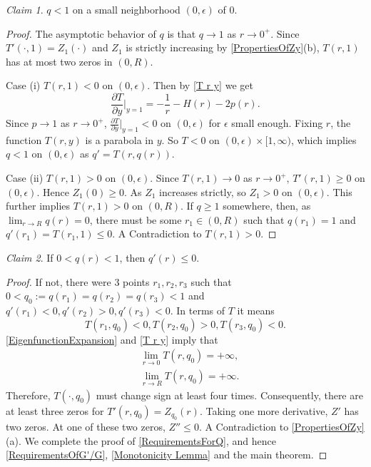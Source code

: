 \documentclass{amsart}
\numberwithin{equation}{section}
\theoremstyle{plain}
\theoremstyle{definition}
\theoremstyle{remark}
\newtheorem*{claim}{Claim}
\begin{document}
\begin{claim}
    $q<1$ on a small neighborhood $(0,\epsilon)$ of $0$.
\end{claim}
\begin{proof}
    The asymptotic behavior of $q$ is that $q \rightarrow 1$ as $r \rightarrow 0^+$. Since $T'(\cdot,1)= Z_1(\cdot)$ and $Z_1$ is strictly increasing by \cref{PropertiesOfZy}(b), $T(r,1)$ has at most two zeros in $(0,R)$.
    \par Case (i) $T(r,1)<0$ on $(0,\epsilon)$. Then by \cref{T r y} we get \[\frac{\partial T}{\partial y}|_{y=1}=-\frac{1}{r}-H(r)-2p(r). \]
    Since $p \rightarrow 1$ as $r \rightarrow 0^+$, $\frac{\partial T}{\partial y}|_{y=1}<0$ on $(0,\epsilon)$ for $\epsilon$ small enough. Fixing $r$, the function $T(r,y)$ is a parabola in $y$. So $T<0$ on $(0, \epsilon) \times[1, \infty)$, which implies $q<1$ on $(0,\epsilon)$ as $q'= T(r,q(r))$.
    \par Case (ii) $T(r,1)>0$ on $(0,\epsilon)$. Since $T(r,1)\rightarrow 0$ as $r\rightarrow 0^+$, $T'(r,1)\geq 0$ on $(0,\epsilon)$. Hence $Z_1(0)\geq 0$. As $Z_1$ increases strictly, so $Z_1>0$ on $(0,\epsilon)$. This further implies $T(r,1)>0$ on $(0,R)$. If $q\geq 1$ somewhere, then, as $\lim _{r \rightarrow R} q(r)=0$, there must be some $r_1 \in (0,R)$ such that $q(r_1)=1$ and $q'(r_1)= T(r_1,1)\leq 0$. A Contradiction to $T(r,1)>0$.
\end{proof}

\begin{claim}
    If $0 <q(r)<1$, then $q'(r) \leq 0$.
\end{claim}
\begin{proof}
    If not, there were 3 points $r_1,r_2,r_3$ such that $0<q_0:=q(r_1)=q(r_2)=q(r_3)<1$ and $q'(r_1)<0, q'(r_2)>0, q'(r_3)<0$. In terms of $T$ it means \[T(r_1,q_0)<0, T(r_2,q_0)>0, T(r_3,q_0)<0.\] \cref{EigenfunctionExpansion} and \cref{T r y} imply that \[\begin{aligned}
& \lim _{r \rightarrow 0} T(r, q_0)=+\infty, \\
& \lim _{r \rightarrow R} T(r, q_0)=+\infty.
\end{aligned}\]
Therefore, $T(\cdot,q_0)$ must change sign at least four times. Consequently, there are at least three zeros for $T'(r,q_0)= Z_{q_0}(r)$. Taking one more derivative, $Z'$ has two zeros. At one of these two zeros, $Z''\leq 0$. A Contradiction to \cref{PropertiesOfZy}(a). We complete the proof of \cref{RequirementsForQ}, and hence \cref{RequirementsOfG'/G}, \cref{Monotonicity Lemma} and the main theorem.
\end{proof}
\end{document}
